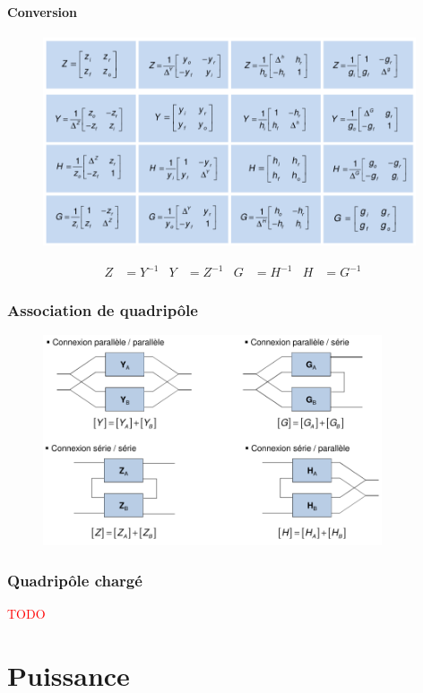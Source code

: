 \documentclass{report}
\begin{document}
\subsubsection{Conversion}
\begin{figure}[H]
\centering
\includegraphics[width=11cm]{img/Conversion.png}
\end{figure}
\begin{align*}
Z &= Y^{-1} & Y&= Z^{-1} & G &= H^{-1} & H &= G^{-1}
\end{align*}

\subsection{Association de quadripôle}
\begin{figure}[H]
\centering
\includegraphics[width=10cm]{img/Assoc.png}
\end{figure}


\subsection{Quadripôle chargé}
\textcolor{red}{TODO}

\chapter{Puissance}
\end{document}
